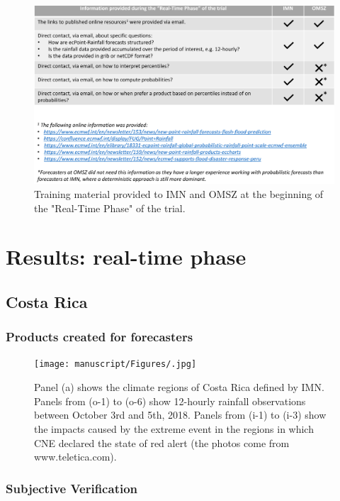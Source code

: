 \documentclass[twocol]{ametsocV5} %
\begin{document}
\begin{figure}
\centerline{\includegraphics[width=39pc]{manuscript/Figures/Remote_Training.png}}
\caption{Training material provided to IMN and OMSZ at the beginning of the "Real-Time Phase" of the trial.}
\label{Fig5}
\end{figure}
 

\section{Results: real-time phase}

\subsection{Costa Rica}

\subsubsection{Products created for forecasters}
\begin{figure}
\centerline{\texttt{[image: manuscript/Figures/.jpg]}}
\caption{Panel (a) shows the climate regions of Costa Rica defined by IMN. Panels from (o-1) to (o-6) show 12-hourly rainfall observations between October 3rd and 5th, 2018. Panels from (i-1) to (i-3) show the impacts caused by the extreme event in the regions in which CNE declared the state of red alert (the photos come from www.teletica.com).}
\label{Fig5}
\end{figure}





\subsubsection{Subjective Verification}
\end{document}
